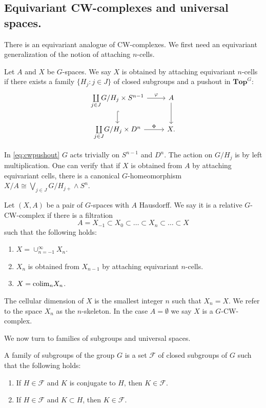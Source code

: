 \subsection{Equivariant CW-complexes and universal spaces.}
There is an equivariant analogue of CW-complexes. We first need an equivariant
generalization of the notion of attaching $n$-cells.
\begin{mydef}
Let $A$ and $X$ be $G$-spaces. We say $X$ is obtained by attaching equivariant $n$-cells
if there exists a family $\{H_j:j\in J\}$ of closed subgroups and a pushout in $\mathbf{Top}^G$:
\begin{equation}\label{eq:cwpushout}
\begin{tikzcd}
\underset{j\in J}{\coprod} G/H_j\times S^{n-1}
\arrow{r}{\varphi}\arrow[hookrightarrow]{d}
&A\arrow{d}\\
\underset{j\in J}{\coprod} G/H_j\times D^{n}
\arrow{r}{\Phi}
&X.
\end{tikzcd}
\end{equation}
\end{mydef}
In \eqref{eq:cwpushout} $G$ acts trivially on $S^{n-1}$ and $D^n$. The action on $G/H_j$ is
by left multiplication. One can verify that if $X$ is obtained from $A$ by attaching equivariant cells, there is
a canonical $G$-homeomorphism $X/A\cong \bigvee_{j\in J} G/H_{j+}\wedge S^n$.
\begin{mydef}
Let $(X,A)$ be a pair of $G$-spaces with $A$ Hausdorff. We say it is a relative $G$-CW-complex
if there is a filtration
\[
A = X_{-1}\subset X_0\subset \ldots\subset X_n\subset \ldots \subset X
\]
such that the following holds:
\begin{enumerate}
\item $X = \cup_{n = -1}^\infty X_n$.
\item $X_n$ is obtained from $X_{n-1}$ by attaching equivariant $n$-cells.
\item $X = \mathrm{colim}_n X_n$.
\end{enumerate}
The cellular dimension of $X$ is the smallest integer $n$ such that $X_n =X$. We refer
to the space $X_n$ as the $n$-skeleton.
In the case $A=\emptyset$ we say $X$ is a $G$-CW-complex.
\end{mydef}

We now turn to families of subgroups and universal spaces.
\begin{mydef}
A family of subgroups of the group $G$ is a set $\mathcal{F}$
of closed subgroups of $G$ such that the following holds:
\begin{enumerate}
\item If $H\in \mathcal{F}$ and $K$ is conjugate to $H$, then  $K\in \mathcal{F}$.
\item If $H\in \mathcal{F}$ and $K\subset H$, then  $K\in \mathcal{F}$.
\end{enumerate}
\end{mydef}


